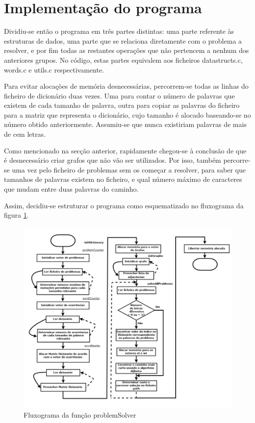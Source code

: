 \documentclass[a4paper, 11pt]{article}
\begin{document}
\section{Implementação do programa}
    \par Dividiu-se então o programa em três partes distintas: uma parte referente às estruturas de dados, uma parte que se relaciona diretamente com o problema a resolver, e por fim todas as restantes operações que não pertencem a nenhum dos anteriores grupos. No código, estas partes equivalem aos ficheiros datastructs.c, words.c e utils.c respectivamente.
    \par Para evitar alocações de memória desnecessárias, percorrem-se todas as linhas do ficheiro de dicionário duas vezes. Uma para contar o número de palavras que existem de cada tamanho de palavra, outra para copiar as palavras do ficheiro para a matriz que representa o dicionário, cujo tamanho é alocado baseando-se no número obtido anteriormente. Assumiu-se que nunca existiriam palavras de mais de cem letras.
    \par Como mencionado na secção anterior, rapidamente chegou-se à conclusão de que é desnecessário criar grafos que não vão ser utilizados. Por isso, também percorre-se uma vez pelo ficheiro de problemas sem os começar a resolver, para saber que tamanhos de palavras existem no ficheiro, e qual número máximo de caracteres que mudam entre duas palavras do caminho.
    \par Assim, decidiu-se estruturar o programa como esquematizado no fluxograma da figura \ref{fig:flux1}.
    
    \begin{figure}
        \includegraphics[width=\linewidth]{fluxograma1.png}
        \caption{Fluxograma da função problemSolver}
        \label{fig:flux1}
    \end{figure}
    
\end{document}
